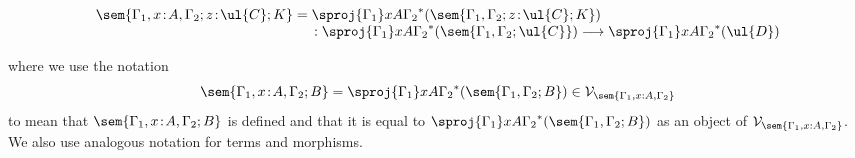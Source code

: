 {\begin{proposition}
\begin{enumerate}[(a)]
\[
\begin{array}{c}
\hspace{-4.5cm}
\sem{\Gamma_1, x \!:\! A, \Gamma_2; z \!:\! \ul{C}; K} = \sproj {\Gamma_1} x A {\Gamma_2}^*(\sem{\Gamma_1, \Gamma_2; z \!:\! \ul{C}; K}) 
\\
\hspace{5.5cm}
: \sproj {\Gamma_1} x A {\Gamma_2}^*(\sem{\Gamma_1, \Gamma_2; \ul{C}}) \longrightarrow \sproj {\Gamma_1} x A {\Gamma_2}^*(\ul{D})
\end{array}
\]
\end{enumerate}
where we use the notation
\[
\sem{\Gamma_1, x \!:\! A,\Gamma_2;B} = \sproj {\Gamma_1} x A {\Gamma_2}^*(\sem{\Gamma_1,\Gamma_2;B}) \in \mathcal{V}_{\sem{\Gamma_1, x : A,\Gamma_2}}
\]
to mean that $\sem{\Gamma_1, x \!:\! A,\Gamma_2;B}$ is defined and that it is equal to $\sproj {\Gamma_1} x A {\Gamma_2}^*(\sem{\Gamma_1,\Gamma_2;B})$ as an object of $\mathcal{V}_{\sem{\Gamma_1, x : A,\Gamma_2}}$. We also use analogous notation for terms and morphisms.
\end{proposition}
\addtocounter{theorem}{-1}
}

